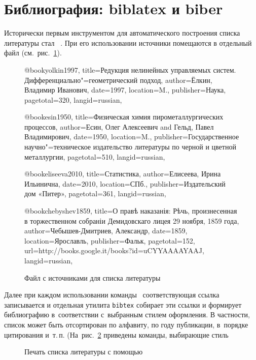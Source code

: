 \documentclass[a4paper,12pt,hyphens]{article}
\newcommand\package[1]{\texttt{#1}}
\newcommand\lcmd[1]{\texttt{#1}}
\DeclareRobustCommand{\myBibTeX}{\BibTeX}
\begin{document}
\section{Библиография: biblatex и biber}\label{sec:Bibliography}
Исторически первым инструментом для автоматического построения
списка литературы стал \BibTeX\ \parencite{ctan-bibtex}. При его
использовании источники
помещаются в отдельный файл (см.~рис.~\ref{bibfile}).
\begin{figure}[tp]
\begin{bibtexcode}
@book{yolkin1997,
  title={Редукция нелинейных управляемых систем.
         Дифференциально"=геометрический подход},
  author={Ёлкин, Владимир Иванович},
  date={1997},
  location={M.},
  publisher={Наука},
  pagetotal={320},
  langid={russian},
}

@book{esin1950,
  title={Физическая химия пирометаллургических процессов},
  author={Есин, Олег Алексеевич and Гельд, Павел Владимирович},
  date={1950},
  location={M.},
  publisher={Государственное научно"=техническое издательство
             литературы по черной и цветной металлургии},
  pagetotal={510},
  langid={russian},
}

@book{eliseeva2010,
  title={Статистика},
  author={Елисеева, Ирина Ильинична},
  date={2010},
  location={СПб.},
  publisher={Издательский дом «Питер»},
  pagetotal={361},
  langid={russian},
}

@book{chebyshev1859,
  title={О правѣ наказанія: Рѣчь, произнесенная в торжественном
         собраніи Демидовскаго лицея 29 ноября, 1859 года},
  author={Чебышев-Дмитриев, Александр},
  date={1859},
  location={Ярославль},
  publisher={Фальк},
  pagetotal={152},
  url={http://books.google.it/books?id=uCYYAAAAYAAJ},
  langid={russian},
}
\end{bibtexcode}
\caption{Файл с источниками для списка литературы}\label{bibfile}
\end{figure}
Далее при каждом использовании команды~\lcmd{\cite{key}} соответствующая
ссылка записывается и отдельная утилита \package{bibtex} собирает эти
ссылки и формирует библиографию в~соответствии с~выбранным стилем оформления.
В частности, список может быть отсортирован по алфавиту, по году
публикации, в~порядке цитирования и~т.\,п.
(На~рис.~\ref{bibliography} приведены команды, выбирающие стиль
\begin{figure}[tp]
\begin{latexcode}


\end{latexcode}
\caption{Печать списка литературы с помощью \myBibTeX}\label{bibliography}
\end{figure}
\end{document}
